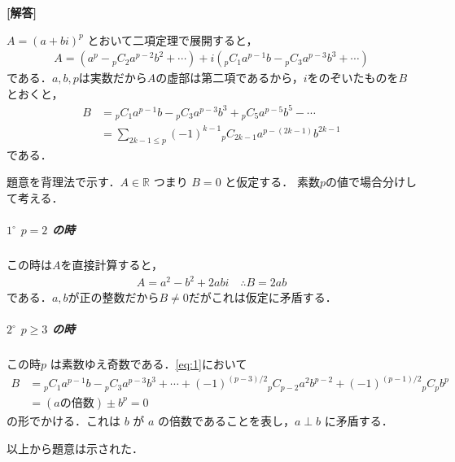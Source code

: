 \documentclass[../../main.tex]{subfiles}
\begin{document}
\begin{oframed}
  
\end{oframed}

{\bf [解答]}

$A = (a+bi)^p$ とおいて二項定理で展開すると，
\begin{align}
  A = (a^p - {}_pC_2 a^{p-2}b^2 + \cdots) + i({}_pC_1 a^{p-1}b - {}_pC_3 a^{p-3}b^3 + \cdots)
\end{align}
である．$a,b,p$は実数だから$A$の虚部は第二項であるから，$i$をのぞいたものを$B$とおくと，
\begin{align}
  B
  &= {}_pC_1 a^{p-1}b - {}_pC_3 a^{p-3}b^3 + {}_pC_5 a^{p-5}b^5 - \cdots \\
  &= \sum_{2k-1 \le p} (-1)^{k-1} {}_pC_{2k-1} a^{p-(2k-1)} b^{2k-1} \label{eq:1}
\end{align}
である．

題意を背理法で示す．$A \in \mathbb{R}$ つまり $B=0$ と仮定する．
素数$p$の値で場合分けして考える．

\subparagraph{$1^\circ$ $p=2$ の時}

この時は$A$を直接計算すると，
\begin{align}
  A = a^2 - b^2 + 2abi \quad \therefore B = 2ab
\end{align}
である．$a,b$が正の整数だから$B \neq 0$だがこれは仮定に矛盾する．

\subparagraph{$2^\circ$ $p \ge 3$ の時}

この時$p$ は素数ゆえ奇数である．\cref{eq:1}において
\begin{align}
  B & = {}_pC_1 a^{p-1}b - {}_pC_3 a^{p-3}b^3 + \cdots + (-1)^{(p-3)/2}{}_pC_{p-2}a^2b^{p-2} + (-1)^{(p-1)/2}{}_pC_p b^p \\
  & = (a\text{の倍数}) \pm b^p = 0
\end{align}
の形でかける．これは $b$ が $a$ の倍数であることを表し，$a \perp b$ に矛盾する．
\casesend

以上から題意は示された．
\end{document}
